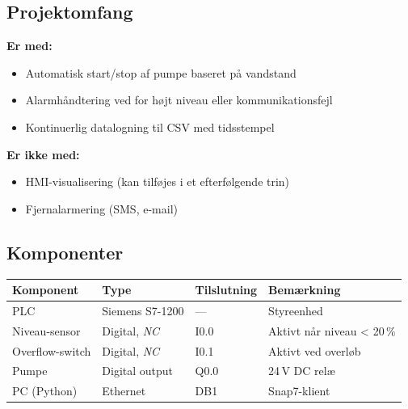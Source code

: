 \documentclass[12pt, a4paper]{article}
\begin{document}
\subsection{Projektomfang}

\begin{tcolorbox}[infobox, title={\faInfoCircle\quad Hvad er med og hvad er ikke med}]
\textbf{Er med:}
\begin{itemize}[leftmargin=1.2em, itemsep=2pt]
  \item Automatisk start/stop af pumpe baseret på vandstand
  \item Alarmhåndtering ved for højt niveau eller kommunikationsfejl
  \item Kontinuerlig datalogning til CSV med tidsstempel
\end{itemize}
\vspace{4pt}
\textbf{Er ikke med:}
\begin{itemize}[leftmargin=1.2em, itemsep=2pt]
  \item HMI-visualisering (kan tilføjes i et efterfølgende trin)
  \item Fjernalarmering (SMS, e-mail)
\end{itemize}
\end{tcolorbox}

\subsection{Komponenter}

\begin{center}
\begin{tabular}{llll}
\toprule
\textbf{Komponent} & \textbf{Type} & \textbf{Tilslutning} & \textbf{Bemærkning} \\
\midrule
PLC                & Siemens S7{-}1200     & ---               & Styreenhed \\
Niveau-sensor      & Digital, \textit{NC}  & I0.0              & Aktivt når niveau < 20\,\% \\
Overflow-switch    & Digital, \textit{NC}  & I0.1              & Aktivt ved overløb \\
Pumpe              & Digital output        & Q0.0              & 24\,V DC relæ \\
PC (Python)        & Ethernet              & DB1               & Snap7-klient \\
\bottomrule
\end{tabular}
\end{center}

\end{document}
